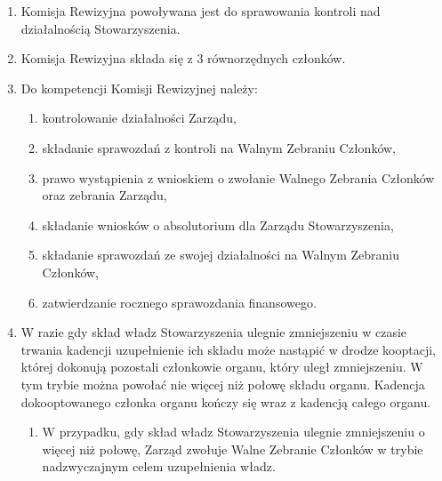 \documentclass{article}
\begin{document}
\begin{enumerate}
    \item Komisja Rewizyjna powoływana jest do sprawowania kontroli nad działalnością Stowarzyszenia.
    \item Komisja Rewizyjna składa się z 3 równorzędnych członków.
    \item Do kompetencji Komisji Rewizyjnej należy:
      \begin{enumerate}
        \item kontrolowanie działalności Zarządu,
        \item składanie sprawozdań z kontroli na Walnym Zebraniu Członków,
        \item prawo wystąpienia z wnioskiem o zwołanie Walnego Zebrania Członków oraz zebrania Zarządu,
        \item składanie wniosków o absolutorium dla Zarządu Stowarzyszenia,
        \item składanie sprawozdań ze swojej działalności na Walnym Zebraniu Członków,
        \item zatwierdzanie rocznego sprawozdania finansowego.
      \end{enumerate}
    \item W razie gdy skład władz Stowarzyszenia ulegnie zmniejszeniu w czasie trwania kadencji uzupełnienie ich składu może nastąpić w drodze kooptacji, której dokonują pozostali członkowie organu, który uległ zmniejszeniu. W tym trybie można powołać nie więcej niż połowę składu organu. Kadencja dokooptowanego członka organu kończy się wraz z kadencją całego organu.
      \begin{enumerate}
        \item W przypadku, gdy skład władz Stowarzyszenia ulegnie zmniejszeniu o więcej niż połowę, Zarząd zwołuje Walne Zebranie Członków w trybie nadzwyczajnym celem uzupełnienia władz.
      \end{enumerate}
  \end{enumerate}
\end{document}
